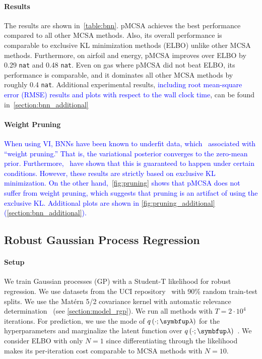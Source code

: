 \vspace{-1.5ex}
\paragraph{Results}
The results are shown in~\cref{table:bnn}.
pMCSA achieves the best performance compared to all other MCSA methods.
Also, its overall performance is comparable to exclusive KL minimization methods (ELBO) unlike other MCSA methods.
Furthermore, on \textsf{airfoil} and \textsf{energy}, pMCSA improves over ELBO by 0.29 \texttt{nat} and 0.48 \texttt{nat}.
Even on \textsf{gas} where pMCSA did not beat ELBO, its performance is comparable, and it dominates all other MCSA methods by roughly 0.4 \texttt{nat}.
Additional experimental results, \textcolor{blue}{including root mean-square error (RMSE) results and plots with respect to the wall clock time}, can be found in~\cref{section:bnn_additional}

\vspace{-1.5ex}
\paragraph{Weight Pruning}
\textcolor{blue}{
When using VI, BNNs have been known to underfit data, which~\citet{mackay_local_2001,pmlr-v70-hoffman17a,trippe_overpruning_2017} associated with ``weight pruning.'' 
That is, the variational posterior converges to the zero-mean prior.
Furthermore,~\citet{coker_wide_2022,huix_variational_2022} have shown that this is guaranteed to happen under certain conditions.
However, these results are strictly based on exclusive KL minimization.
On the other hand,~\cref{fig:pruning} shows that pMCSA does not suffer from weight pruning, which suggests that pruning is an artifact of using the exclusive KL.
Additional plots are shown in \cref{fig:pruning_additional} (\cref{section:bnn_additional}).
}%
%



\vspace{-1.5ex}
\subsection{Robust Gaussian Process Regression}\label{section:bgp}
\vspace{-1.5ex}
\paragraph{Setup}
We train Gaussian processes (GP) with a Student-T likelihood for robust regression.
We use datasets from the UCI repository~\citep{Dua:2019} with 90\% random train-test splits.
We use the Mat\'ern 5/2 covariance kernel with automatic relevance determination~\citep{neal_bayesian_1996} (see \cref{section:model_rgp}).
We run all methods with \(T=2\cdot10^4\) iterations.
For prediction, we use the mode of \(q\left(\cdot; \vlambda\right)\) for the hyperparameters and marginalize the latent function over \(q\left(\cdot; \vlambda\right)\)~\citep{rasmussen_gaussian_2006}.
We consider ELBO with only \(N=1\) since differentiating through the likelihood makes its per-iteration cost comparable to MCSA methods with \(N=10\).

